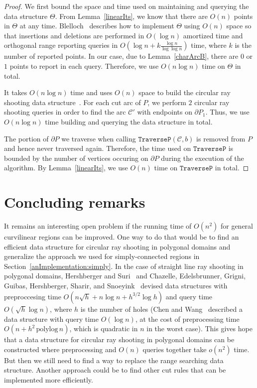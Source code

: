 \documentclass{article}
\newcommand{\ttt}[1]{\texttt{#1}}
\newcommand{\PP}{P}
\newcommand{\cut}{\mathcal C}
\begin{document}
\begin{proof}
We first bound the space and time used on maintaining and querying the data structure
$\Theta$.
From Lemma~\ref{linearIts}, we know that there are $O(n)$ points in $\Theta$ at
any time. Blelloch~\cite{blelloch2008space} describes how to implement
$\Theta$ using $O(n)$ space so that insertions and deletions are performed in
$O(\log n)$ amortized time and
orthogonal range reporting queries in
$O\left(\log n+k\frac{\log n}{\log \log n}\right)$
time, where $k$ is the number of reported points.
In our case, due to Lemma~\ref{charArcB}, there are $0$ or $1$ points
to report in each query.
Therefore, we use $O(n\log n)$ time on $\Theta$ in total.

It takes $O(n\log n)$ time and uses $O(n)$ space to build the circular ray shooting data structure~\cite{Cheng04}.
For each cut arc of $\PP$, we perform $2$ circular ray shooting queries in order to find the arc $\cut'$ with endpoints on $\partial\PP_1$.
Thus, we use $O(n\log n)$ time building and querying the data structure in total.

The portion of $\partial\PP$ we traverse when calling
$\ttt{TraverseP}(\cut,b)$ is removed from $\PP$ and hence never traversed again.
Therefore, the time used on $\ttt{TraverseP}$ is bounded by the number of
vertices occuring on $\partial\PP$ during the execution of the algorithm.
By Lemma~\ref{linearIts}, we use $O(n)$ time on $\ttt{TraverseP}$
in total.
\end{proof}

\section{Concluding remarks}
It remains an interesting open problem if the running time of $O(n^2)$ for general curvilinear regions can be improved.
One way to do that would be to find an efficient data structure for circular ray shooting in polygonal domains and generalize the approach we used for simply-connected regions in Section~\ref{anImplementation:simply}.
In the case of straight line ray shooting in polygonal domains, Hershberger and Suri~\cite{hershberger95pedestrian} and Chazelle, Edelsbrunner, Grigni, Guibas, Hershberger, Sharir, and Snoeyink~\cite{chazelle94ray} devised data structures with preproccesing time $O(n\sqrt h+n\log n+h^{3/2}\log h)$ and query time $O(\sqrt h\log n)$, where $h$ is the number of holes (Chen and Wang~\cite{chen2015visibility} described a data structure with query time $O(\log n)$, at the cost of preprocessing time $O(n+h^2\,\text{polylog}\, n)$, which is quadratic in $n$ in the worst case).
This gives hope that a data structure for circular ray shooting in polygonal domains can be constructed where preprocessing and $O(n)$ queries together take $o(n^2)$ time.
But then we still need to find a way to replace the range searching data structure.
Another approach could be to find other cut rules that can be implemented more efficiently.
\end{document}
